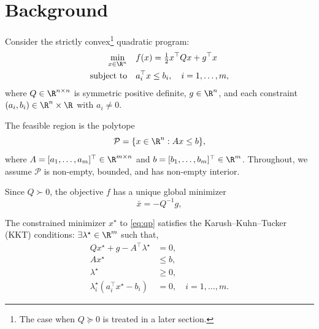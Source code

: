 \section{Background}\label{sec:background}

Consider the strictly convex\footnote{The case when $Q \succeq 0$ is treated in a later section.} quadratic program:
\begin{equation}\label{eq:qp}
\begin{aligned}
\min_{x \in \R^n} \quad & f(x) = \tfrac{1}{2}x^\top Q x + g^\top x \\
\text{subject to} \quad & a_i^\top x \leq b_i, \quad i = 1,\ldots,m,
\end{aligned}
\end{equation}
where $Q \in \R^{n \times n}$ is symmetric positive definite, $g \in \R^n$, and each constraint $(a_i, b_i) \in \R^n \times \R$ with $a_i \neq 0$. 

\begin{definition}\label{def:polytope}
The feasible region is the polytope
\begin{equation}
\mathcal{P} = \{x \in \R^n : Ax \leq b\},
\end{equation}
where $A = [a_1, \ldots, a_m]^\top \in \R^{m \times n}$ and $b = [b_1, \ldots, b_m]^\top \in \R^m$. Throughout, we assume $\mathcal{P}$ is non-empty, bounded, and has non-empty interior.
\end{definition}

\begin{definition}\label{def:xbar}
Since $Q \succ 0$, the objective $f$ has a unique global minimizer
\begin{equation}
\bar{x} = -Q^{-1}g,
\end{equation}
\end{definition}

The constrained minimizer $x^\star$ to \eqref{eq:qp} satisfies the Karush--Kuhn--Tucker (KKT) conditions: $ \exists \lambda^\star \in \R^m$ such that,
\begin{subequations}
\begin{align}
Qx^\star + g - A^\top \lambda^\star &= 0, \label{eq:kkt_stationarity}\\
Ax^\star &\leq b, \label{eq:kkt_primal}\\
\lambda^\star &\geq 0, \label{eq:kkt_dual}\\
\lambda_i^\star(a_i^\top x^\star - b_i) &= 0, \quad i=1,\ldots,m. \label{eq:kkt_complementarity}
\end{align}
\end{subequations}

